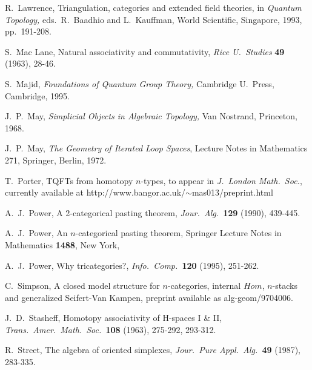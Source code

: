 \begin{thebibliography}{10}
 R.\ Lawrence, Triangulation, categories and
extended field theories, in {\sl Quantum Topology,} eds.\ R.\ Baadhio
and L.\ Kauffman, World Scientific, Singapore, 1993, pp.\
191-208.

 S.\ Mac Lane, Natural associativity and
commutativity, {\sl Rice U.\ Studies} {\bf 49} (1963), 28-46.

 S.\ Majid, {\sl Foundations of Quantum Group Theory,}
Cambridge U.\ Press, Cambridge, 1995.

 J.\ P.\ May, {\sl Simplicial Objects in Algebraic Topology,}
Van Nostrand, Princeton, 1968.

 J.\ P.\ May, {\sl The Geometry of Iterated
Loop Spaces}, Lecture Notes in Mathematics 271, Springer, Berlin,
1972.

 T.\ Porter, TQFTs from homotopy $n$-types, to appear in
{\sl J.\ London Math.\ Soc.}, currently available at
http://www.bangor.ac.uk/$\sim$mas013/preprint.html

 A.\ J.\ Power, A 2-categorical pasting theorem, 
{\sl Jour.\ Alg.\ }{\bf 129} (1990), 439-445.

 A.\ J.\ Power, An $n$-categorical pasting theorem, 
Springer Lecture Notes in Mathematics {\bf 1488}, New York,

 A.\ J.\ Power, Why tricategories?, {\it Info.\ Comp.\
}{\bf 120} (1995), 251-262.

 C.\ Simpson, A closed model structure for
$n$-categories, internal $Hom$, $n$-stacks and generalized Seifert-Van
Kampen, preprint available as alg-geom/9704006.



 J.\ D.\ Stasheff, Homotopy associativity of
H-spaces I \& II, {\sl Trans.\ Amer.\ Math.\ Soc.\ }{\bf 108} (1963),
275-292, 293-312. 

 R.\ Street, The algebra of oriented simplexes, 
{\sl Jour.\ Pure Appl.\ Alg.\ }{\bf 49} (1987), 283-335.


\end{thebibliography}
